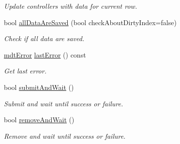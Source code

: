 \begin{DoxyCompactItemize}
\begin{DoxyCompactList}\small\item\em Update controllers with data for current row. \end{DoxyCompactList}\item 
bool \hyperlink{classmdt_abstract_sql_table_controller_aabbf1bff271014d55a8d6e9391c691a6}{all\-Data\-Are\-Saved} (bool check\-About\-Dirty\-Index=false)
\begin{DoxyCompactList}\small\item\em Check if all data are saved. \end{DoxyCompactList}\item 
\hyperlink{classmdt_error}{mdt\-Error} \hyperlink{classmdt_abstract_sql_table_controller_a085ff6b261917b19b130e30123a166ad}{last\-Error} () const 
\begin{DoxyCompactList}\small\item\em Get last error. \end{DoxyCompactList}\item 
bool \hyperlink{classmdt_abstract_sql_table_controller_ab1d75ed2eb77baf4324cea09e281c91e}{submit\-And\-Wait} ()
\begin{DoxyCompactList}\small\item\em Submit and wait until success or failure. \end{DoxyCompactList}\item 
bool \hyperlink{classmdt_abstract_sql_table_controller_a066b7b828b6249b7ac2431d6d57c234d}{remove\-And\-Wait} ()
\begin{DoxyCompactList}\small\item\em Remove and wait until success or failure. \end{DoxyCompactList}\end{DoxyCompactItemize}
